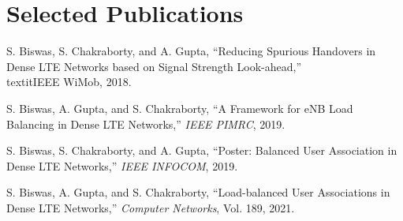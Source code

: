 \section{Selected Publications}
\begin{innerlist}
  \item S. Biswas, S. Chakraborty, and A. Gupta, ``Reducing Spurious Handovers in Dense LTE Networks based on Signal Strength Look-ahead,'' \\textit{IEEE WiMob}, 2018.
  \item S. Biswas, A. Gupta, and S. Chakraborty, ``A Framework for eNB Load Balancing in Dense LTE Networks,'' \textit{IEEE PIMRC}, 2019.
  \item S. Biswas, S. Chakraborty, and A. Gupta, ``Poster: Balanced User Association in Dense LTE Networks,'' \textit{IEEE INFOCOM}, 2019. 
  \item S. Biswas, A. Gupta, and S. Chakraborty, ``Load-balanced User Associations in Dense LTE Networks,'' \textit{Computer Networks}, Vol. 189, 2021.
\end{innerlist}
